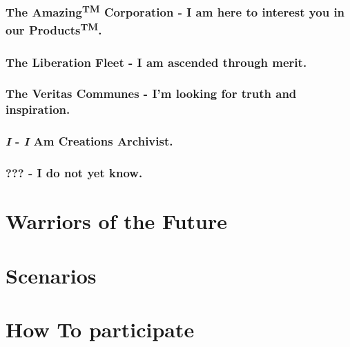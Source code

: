 \documentclass[a4paper,12pt]{book}
\begin{document}
\subsection{The Amazing\textsuperscript{TM} Corporation - I am here to interest you in our Products\textsuperscript{TM}.}

\subsection{The Liberation Fleet - I am ascended through merit.}

\subsection{The  Veritas Communes - I'm looking for truth and inspiration. }

\subsection{\textit{I} - \textit{I} Am Creations Archivist.}

\subsection{??? - I do not yet know.}

\chapter{Warriors of the Future}

\chapter{Scenarios}

\chapter{How To participate}
\end{document}
